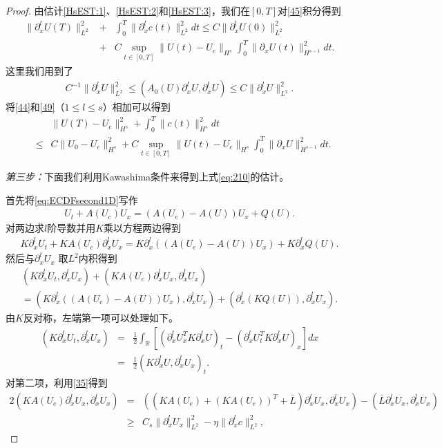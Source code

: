 \begin{proof}
由估计\eqref{HsEST:1}、\eqref{HsEST:2}和\eqref{HsEST:3}，我们在$[0,T]$对\eqref{45}积分得到
\begin{eqnarray}\label{49}
  \|\partial^l_x U(T)\|_{L^2}^2&  + & \int_0^T \|\partial^l_x c(t)\|^2_{L^2}dt \le C\|\partial^l_x U(0)\|_{L^2}^2  \nonumber\\[3mm]
 & +& C\sup_{t \in [0,T]}\|U(t)-U_e\|_{H^s} \int_0^T \|\partial_x U(t)\|^2_{H^{s-1}}dt .
\end{eqnarray}
这里我们用到了
\begin{eqnarray*}
   C^{-1} \|\partial^l_x U\|_{L^2}^2 \le  (A_0(U) \partial^l_x U,\partial^l_x U) \le C \|\partial^l_x U\|_{L^2}^2.
\end{eqnarray*}
将\eqref{44}和\eqref{49}（$1 \le l \le s$）相加可以得到
  \begin{eqnarray}\label{210}
    && \|U(T)-U_e\|^2_{H^{s}}  +  \int_0^T \|c(t)\|^2_{H^s} dt \nonumber \\
    & \le & C \|U_0-U_e\|_{H^{s}}^2 + C \sup_{t \in [0,T]} \|U(t) - U_e\|_{H^s} \int_0^T \|\partial_x U\|_{H^{s-1}}^2dt.
\end{eqnarray}

\emph{第三步：}下面我们利用Kawashima条件来得到上式\eqref{eq:210}的估计。

首先将\eqref{eq:ECDFsecond1D}写作
\begin{eqnarray*}
  U_t + A(U_e) U_x  = (A(U_e) -A(U))U_x + Q(U).
\end{eqnarray*}
对两边求$l$阶导数并用$K$乘以方程两边得到
\begin{eqnarray*}
  K \partial^l_x U_t + K A(U_e) \partial^l_x U_x  = K \partial^l_x ((A(U_e)-A(U))U_x) + K\partial^l_x Q(U).
\end{eqnarray*}
然后与$\partial^l_x U_x$ 取$L^2$内积得到
\begin{eqnarray}\label{211}
  (K \partial^l_x U_t, \partial^l_x U_x) + (KA(U_e) \partial^l_x U_x, \partial^l_x U_x) \nonumber \\ = (K \partial^l_x((A(U_e)-A(U))U_x),\partial^l_x U_x) + (\partial^l_x( K Q(U) ),\partial^l_x U_x).
\end{eqnarray}
由$K$反对称，左端第一项可以处理如下。
\begin{eqnarray}\label{212}
  (K\partial^l_x U_t, \partial^l_x U_x) &=& \frac{1}{2} \int_\mathbb{R} \left[(\partial^l_x U^T_x K \partial^l_x U )_t -  (\partial^l_x U_t^T K\partial^l_x U  )_x \right]dx  \nonumber \\
  &=& \frac{1}{2}(K \partial^l_x U,\partial^l_x U_x)_t .
\end{eqnarray}
对第二项，利用\eqref{35}得到
\begin{eqnarray}\label{213}
  2(KA(U_e) \partial^l_x U_x,\partial^l_x U_x) &=& ( (KA(U_e)+ (K A(U_e))^T +\bar{L}) \partial^l_x U_x, \partial^l_x U_x) - (\bar{L}\partial^l_x U_x, \partial^l_x U_x) \nonumber\\
  &\ge& C_s \|\partial^l_x U_x \|^2_{L^2} -\eta \|\partial^l_x c\|^2_{L^2},
\end{eqnarray}


\end{proof}
